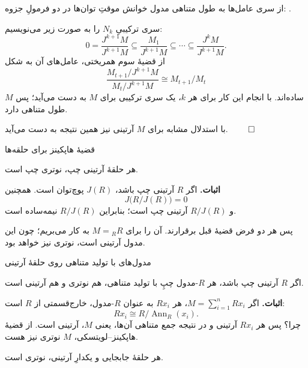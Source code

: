 \begin{frame}[t]{از سری عامل‌ها به طول متناهی مدول}
\label{lec15:lift-composition-series}
\alert{خوانش موقتِ توان‌ها در دو فرمولِ جزوه: .}
\medskip

سری ترکیبیِ \(N_k\) را به صورت زیر می‌نویسیم:
\[
 0=\frac{J^{k+1}M}{J^{k+1}M}
 \subseteq\frac{M_1}{J^{k+1}M}\subseteq\cdots
 \subseteq\frac{J^kM}{J^{k+1}M}.
\]
از قضیهٔ سوم همریختی، عامل‌های آن به شکل
\[
 \frac{M_{t+1}/J^{k+1}M}{M_t/J^{k+1}M}
 \cong M_{t+1}/M_t
\]
ساده‌اند. با انجام این کار برای هر \(k\)، یک سری ترکیبی برای \(M\) به دست می‌آید؛ پس \(M\) طول متناهی دارد.
\medskip

با استدلال مشابه برای \(M\) آرتینی نیز همین نتیجه به دست می‌آید. \hfill\(\qed\)
\end{frame}

\begin{frame}[t]{قضیهٔ هاپکینز برای حلقه‌ها}
\label{lec15:artinian-implies-noetherian}
\begin{theorem}[هاپکینز، \lr{1939}]
هر حلقهٔ آرتینی چپ، نوتری چپ است.
\end{theorem}
\textbf{اثبات.} اگر \(R\) آرتینی چپ باشد، \(J(R)\) پوچ‌توان است. همچنین
\[
 J\bigl(R/J(R)\bigr)=0
\]
و \(R/J(R)\) آرتینی چپ است؛ بنابراین \(R/J(R)\) نیمه‌ساده است.
\medskip

پس هر دو فرض قضیهٔ قبل برقرارند. آن را برای \(M={}_RR\) به کار می‌بریم؛ چون این مدول آرتینی است، نوتری نیز خواهد بود.
\end{frame}

\begin{frame}[t]{مدول‌های با تولید متناهی روی حلقهٔ آرتینی}
\label{lec15:fg-modules-artinian}
\begin{corollary}
اگر \(R\) آرتینی چپ باشد، هر \(R\)-مدول چپِ با تولید متناهی، هم نوتری و هم آرتینی است.
\end{corollary}
\textbf{اثبات.} اگر \(M=\sum_{i=1}^{n}Rx_i\)، هر \(Rx_i\) به عنوان \(R\)-مدول، خارج‌قسمتی از \(R\) است:
\[
 Rx_i\cong R/\operatorname{Ann}_R(x_i).
\]
\alert{چرا؟}
پس هر \(Rx_i\) آرتینی و در نتیجه جمع متناهی آن‌ها، یعنی \(M\)، آرتینی است.
از قضیهٔ هاپکینز--لویتسکی، \(M\) نوتری نیز هست.
\begin{corollary}
هر حلقهٔ جابجایی و یکدارِ آرتینی، نوتری است.
\end{corollary}
\end{frame}

